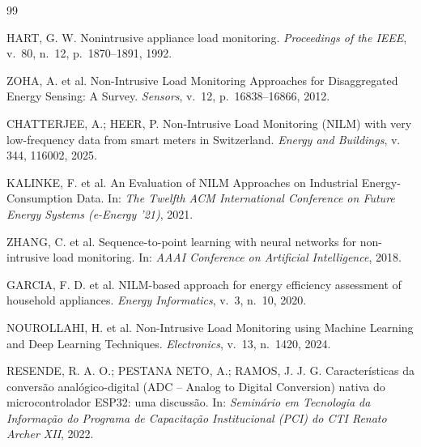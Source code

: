 \documentclass[12pt]{article}
\begin{document}
\begin{thebibliography}{99}

 HART, G. W. Nonintrusive appliance load monitoring.
  \textit{Proceedings of the IEEE}, v.~80, n.~12, p.~1870--1891, 1992.

 ZOHA, A. et al. Non-Intrusive Load Monitoring Approaches for
  Disaggregated Energy Sensing: A Survey. \textit{Sensors}, v.~12,
  p.~16838--16866, 2012.

 CHATTERJEE, A.; HEER, P. Non-Intrusive Load Monitoring (NILM)
  with very low-frequency data from smart meters in Switzerland.
  \textit{Energy and Buildings}, v. 344, 116002, 2025.

 KALINKE, F. et al. An Evaluation of NILM Approaches on
  Industrial Energy-Consumption Data. In: \textit{The Twelfth ACM
  International Conference on Future Energy Systems (e-Energy '21)}, 2021.

 ZHANG, C. et al. Sequence-to-point learning with neural
  networks for non-intrusive load monitoring. In: \textit{AAAI Conference on
  Artificial Intelligence}, 2018.

 GARCIA, F. D. et al. NILM-based approach for energy efficiency
  assessment of household appliances. \textit{Energy Informatics}, v.~3,
  n.~10, 2020.

 NOUROLLAHI, H. et al. Non-Intrusive Load Monitoring using
  Machine Learning and Deep Learning Techniques. \textit{Electronics}, v.~13,
  n.~1420, 2024.

 RESENDE, R. A. O.; PESTANA NETO, A.; RAMOS, J. J. G.
  Caracter\'isticas da convers\~ao anal\'ogico-digital (ADC -- Analog to
  Digital Conversion) nativa do microcontrolador ESP32: uma discuss\~ao. In:
  \textit{Semin\'ario em Tecnologia da Informa\c{c}\~ao do Programa de
  Capacita\c{c}\~ao Institucional (PCI) do CTI Renato Archer XII}, 2022.

\end{thebibliography}
\end{document}
